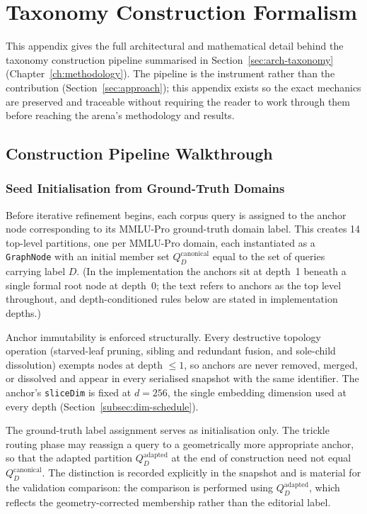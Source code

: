 \chapter{Taxonomy Construction Formalism}\label{app:dag-formalism}\label{sec:meth-construction-summary}

This appendix gives the full architectural and mathematical detail
behind the taxonomy construction pipeline summarised in
Section~\ref{sec:arch-taxonomy} (Chapter~\ref{ch:methodology}).
The pipeline is the instrument rather than the contribution
(Section~\ref{sec:approach}); this appendix exists so the exact
mechanics are preserved and traceable without requiring the reader to
work through them before reaching the arena's methodology and
results.

\section{Construction Pipeline Walkthrough}\label{sec:app-dag-pipeline}

\subsection{Seed Initialisation from Ground-Truth Domains}

Before iterative refinement begins, each corpus query is assigned to
the anchor node corresponding to its MMLU-Pro ground-truth domain label.
This creates 14 top-level partitions, one per MMLU-Pro domain, each
instantiated as a \texttt{GraphNode} with an initial member set
$Q_D^{\text{canonical}}$ equal to the set of queries carrying label
$D$.
(In the implementation the anchors sit at depth~1 beneath a single
formal root node at depth~0; the text refers to anchors as the top
level throughout, and depth-conditioned rules below are stated in
implementation depths.)

Anchor immutability is enforced structurally. Every destructive
topology operation (starved-leaf pruning, sibling and redundant fusion,
and sole-child dissolution) exempts nodes at depth $\leq 1$,
so anchors are never removed, merged, or dissolved and appear in every
serialised snapshot with the same identifier.
The anchor's \texttt{sliceDim} is fixed at $d = 256$, the single
embedding dimension used at every depth
(Section~\ref{subsec:dim-schedule}).

The ground-truth label assignment serves as initialisation only.
The trickle routing phase may reassign a query to a geometrically more
appropriate anchor, so that the adapted partition
$Q_D^{\text{adapted}}$ at the end of construction need not equal
$Q_D^{\text{canonical}}$.
The distinction is recorded explicitly in the snapshot and is
material for the validation comparison: the comparison is performed
using $Q_D^{\text{adapted}}$, which reflects the geometry-corrected
membership rather than the editorial label.

